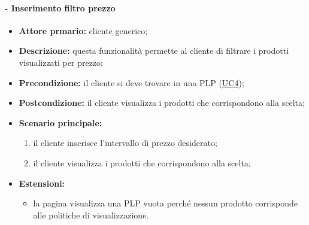 \paragraph{ - Inserimento filtro prezzo}
\begin{itemize}
    \item \textbf{Attore prmario:} cliente generico;
    \item \textbf{Descrizione:} questa funzionalità permette al cliente di filtrare i prodotti visualizzati per prezzo;
    \item \textbf{Precondizione:} il cliente si deve trovare in una PLP (\hyperref[UC4]{UC4});
    \item \textbf{Postcondizione:} il cliente visualizza i prodotti che corrispondono alla scelta;
    \item \textbf{Scenario principale:}
          \begin{enumerate}
              \item il cliente inserisce l'intervallo di prezzo desiderato;
              \item il cliente visualizza i prodotti che corrispondono alla scelta;
          \end{enumerate}
    \item \textbf{Estensioni:}
          \begin{itemize}
              \item la pagina visualizza una PLP vuota perché nessun prodotto corrisponde alle politiche di visualizzazione.
          \end{itemize}
\end{itemize}

\stepsubsubUserCase
